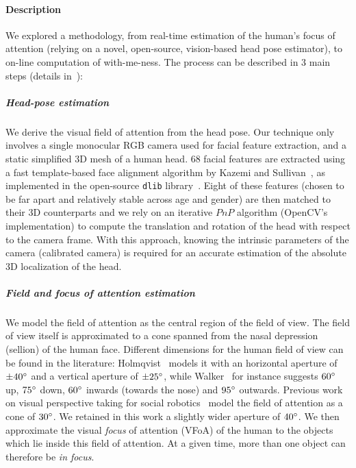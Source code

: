\documentclass[10pt,a4paper]{article}
\begin{document}
\paragraph{Description}
We explored a methodology, from real-time
estimation of the human's focus of attention (relying on a novel, open-source,
vision-based head pose estimator), to on-line computation of with-me-ness. The process can be described in 3 main steps (details in~\cite{lemaignan2016realtime}):

\subparagraph{Head-pose estimation}
We derive the visual field of attention from the head pose. Our
technique only involves a single monocular RGB camera used for facial feature
extraction, and a static simplified 3D mesh of a human head.  68 facial features
are extracted using a fast template-based face alignment algorithm by Kazemi and
Sullivan~\cite{kazemi2014one}, as implemented in the open-source {\tt dlib}
library~\cite{dlib09}.  Eight of these features (chosen to be far apart and
relatively stable across age and gender) are then matched to their 3D
counterparts and we rely on an iterative $PnP$
algorithm (OpenCV's implementation) to compute the translation and rotation of
the head with respect to the camera frame. With this approach, knowing the
intrinsic parameters of the camera (calibrated camera) is required for an
accurate estimation of the absolute 3D localization of the head.

\subparagraph{Field and focus of attention estimation}
We model the field of attention as the central region of the field of view.  The
field of view itself is approximated to a cone spanned from the nasal depression
(sellion) of the human face. Different dimensions for the human field of view
can be found in the literature: Holmqvist~\cite{holmqvist2011eye} models it
with an horizontal aperture of $ \pm 40\degree $ and a vertical aperture of $
\pm 25\degree $, while Walker~\cite{walker1980clinical} for instance suggests
$60\degree$ up, $75\degree$ down, $60\degree$ inwards (towards the nose) and
$95\degree$ outwards.  Previous work on visual perspective taking for social
robotics~\cite{sisbot2011situation} model the field of attention as a cone of
$30\degree$. We retained in this work a slightly wider aperture of $40\degree$.
We then approximate the visual \emph{focus} of attention (VFoA) of the human to
the objects which lie inside this field of attention. At
a given time, more than one object can therefore be \emph{in focus}.
\end{document}
